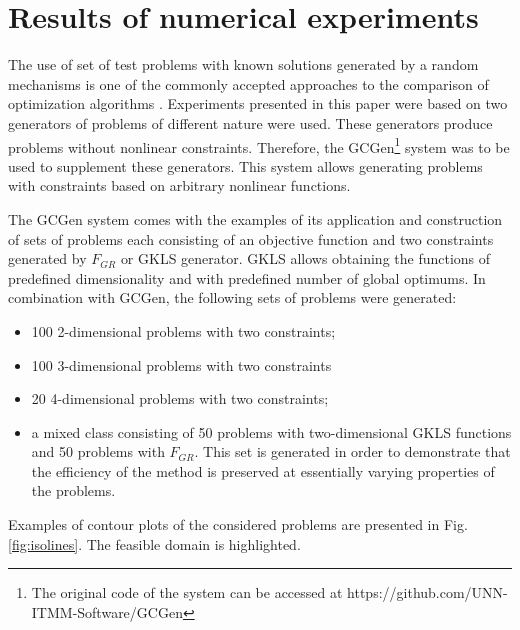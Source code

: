 \documentclass[runningheads]{llncs}
\begin{document}
\section{Results of numerical experiments}
\label{sec:exps}

The use of set of test problems with known solutions generated by a random mechanisms is
one of the commonly accepted approaches to the comparison of optimization algorithms
\cite{Beiranvand2017}.
Experiments presented in this paper were based on two generators of problems of different nature
\cite{grishaginClass, Gaviano2003} were used.
These generators produce problems without nonlinear constraints. Therefore, the
GCGen\footnote{The original code of the system can be accessed at https://github.com/UNN-
ITMM-Software/GCGen} \cite{GergelBarkalov2019} system was to be used to supplement these generators.
This system allows generating problems with constraints based on arbitrary nonlinear
functions.

The GCGen system comes with the examples of its application and construction of sets of
problems each consisting of an objective function and two constraints generated by \(F_{GR}\)
\cite{grishaginClass} or GKLS \cite{Gaviano2003} generator.
GKLS \cite{Gaviano2003} allows obtaining the functions of predefined dimensionality and
with predefined number of global optimums.
In combination with GCGen, the following sets of problems were generated:
\begin{itemize}
  \item 100 2-dimensional problems with two constraints;
  \item 100 3-dimensional problems with two constraints
  \item 20 4-dimensional problems with two constraints;
  \item a mixed class consisting of 50 problems with
  two-dimensional GKLS functions and 50 problems with \(F_{GR}\).
  This set is generated in order to demonstrate that the efficiency of the method is preserved at essentially
  varying properties of the problems.
\end{itemize}

Examples of contour plots of the considered problems are presented in Fig. \ref{fig:isolines}.
The feasible domain is highlighted.
\end{document}
